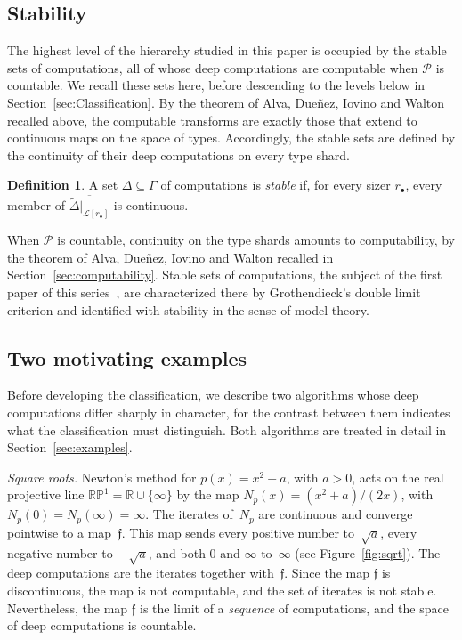 \documentclass[psamsfonts]{amsart}
\theoremstyle{definition}
\newtheorem{defn}[thm]{Definition}
\theoremstyle{remark}
\newcommand{\RP}{\mathbb{R}\mathbb{P}}
\numberwithin{equation}{section}
\begin{document}
\subsection{Stability}
\label{sec:stable}
The highest level of the hierarchy studied in this paper is occupied by the stable sets of computations, all of whose deep computations are computable when $\mathcal{P}$ is countable.
We recall these sets here, before descending to the levels below in Section~\ref{sec:Classification}.
By the theorem of Alva, Dueñez, Iovino and Walton recalled above, the computable transforms are exactly those that extend to continuous maps on the space of types.
Accordingly, the stable sets are defined by the continuity of their deep computations on every type shard.

\begin{defn}\label{def:stable}
  A set $\Delta\subseteq\Gamma$ of computations is \emph{stable} if, for every sizer $r_\bullet$, every member of $\overline{\tilde\Delta|_{\mathcal{L}[r_\bullet]}}$ is continuous.
\end{defn}

When $\mathcal{P}$ is countable, continuity on the type shards amounts to computability, by the theorem of Alva, Dueñez, Iovino and Walton recalled in Section~\ref{sec:computability}.
Stable sets of computations, the subject of the first paper of this series~\cite{alva2024approximability}, are characterized there by Grothendieck’s double limit criterion and identified with stability in the sense of model theory.

\subsection{Two motivating examples}
\label{sec:preview}
Before developing the classification, we describe two algorithms whose deep computations differ sharply in character, for the contrast between them indicates what the classification must distinguish.
Both algorithms are treated in detail in Section~\ref{sec:examples}.

\emph{Square roots.}
Newton’s method for $p(x)=x^2-a$, with $a>0$, acts on the real projective line $\RP^1=\mathbb{R}\cup\{\infty\}$ by the map $N_p(x)=(x^2+a)/(2x)$, with $N_p(0)=N_p(\infty)=\infty$.
The iterates of~$N_p$ are continuous and converge pointwise to a map~$\mathfrak f$.
This map sends every positive number to~$\sqrt a$, every negative number to~$-\sqrt a$, and both $0$ and $\infty$ to~$\infty$ (see Figure~\ref{fig:sqrt}).
The deep computations are the iterates together with~$\mathfrak f$.
Since the map $\mathfrak f$ is discontinuous, the map is not computable, and the set of iterates is not stable.
Nevertheless, the map $\mathfrak f$ is the limit of a \emph{sequence} of computations, and the space of deep computations is countable.
\end{document}
